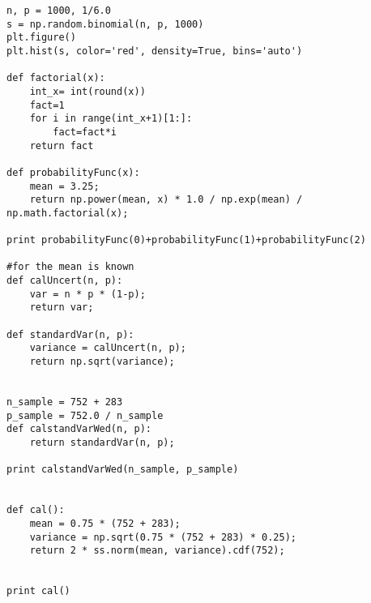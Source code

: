 \lstset{language=python}
\begin{lstlisting}
n, p = 1000, 1/6.0
s = np.random.binomial(n, p, 1000)
plt.figure()
plt.hist(s, color='red', density=True, bins='auto')

def factorial(x):  
    int_x= int(round(x))
    fact=1
    for i in range(int_x+1)[1:]:
        fact=fact*i
    return fact

def probabilityFunc(x):
    mean = 3.25;
    return np.power(mean, x) * 1.0 / np.exp(mean) / np.math.factorial(x);

print probabilityFunc(0)+probabilityFunc(1)+probabilityFunc(2)

#for the mean is known
def calUncert(n, p):
    var = n * p * (1-p);
    return var;

def standardVar(n, p):
    variance = calUncert(n, p);
    return np.sqrt(variance);


n_sample = 752 + 283
p_sample = 752.0 / n_sample
def calstandVarWed(n, p):
    return standardVar(n, p);

print calstandVarWed(n_sample, p_sample)


def cal():
    mean = 0.75 * (752 + 283);
    variance = np.sqrt(0.75 * (752 + 283) * 0.25);
    return 2 * ss.norm(mean, variance).cdf(752);
    

print cal()

\end{lstlisting}
